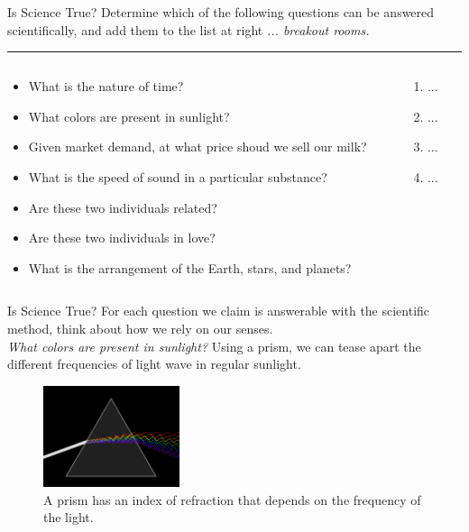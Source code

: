 \documentclass{beamer}
\begin{document}
\begin{frame}{Is Science True?}
\small
Determine which of the following questions can be answered scientifically, and add them to the list at right \textit{... breakout rooms.}
\rule{10cm}{0.05cm}
\begin{columns}
\begin{column}{0.65\textwidth}
\begin{itemize}
\item What is the nature of time?
\item What colors are present in sunlight?
\item Given market demand, at what price shoud we sell our milk?
\item What is the speed of sound in a particular substance?
\item Are these two individuals related?
\item Are these two individuals in love?
\item What is the arrangement of the Earth, stars, and planets?
\end{itemize}
\end{column}
\begin{column}{0.35\textwidth}
\begin{enumerate}
\item ...
\item ...
\item ...
\item ...
\end{enumerate}
\end{column}
\end{columns}
\end{frame}

\begin{frame}{Is Science True?}
For each question we claim is answerable with the scientific method, think about how we rely on our senses. \\ \vspace{0.5cm}
\textit{What colors are present in sunlight?} Using a prism, we can tease apart the different frequencies of light wave in regular sunlight.
\begin{figure}
\centering
\includegraphics[width=4cm]{figures/prism.png}
\caption{A prism has an index of refraction that depends on the frequency of the light.}
\end{figure}
\end{frame}
\end{document}
